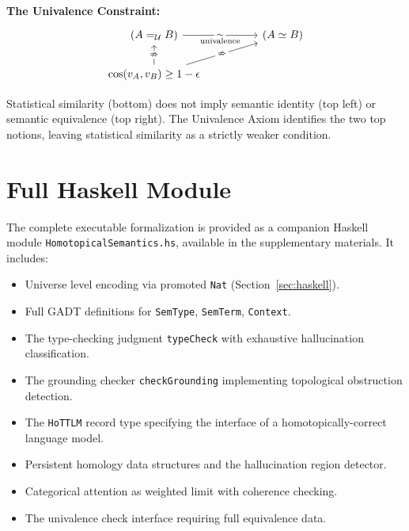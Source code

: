 \documentclass[11pt,a4paper,twocolumn]{article}
\theoremstyle{plain}
\theoremstyle{definition}
\begin{document}
\medskip
\textbf{The Univalence Constraint:}
\[
\begin{tikzcd}[column sep=huge]
(A =_{\mathcal{U}} B) \arrow[r, "\sim" {description}, "\text{univalence}"'] & (A \simeq B) \\
\cos(v_A, v_B) \geq 1-\epsilon \arrow[u, "\nRightarrow" {description}] \arrow[ur, "\nRightarrow"' {description}] &
\end{tikzcd}
\]

Statistical similarity (bottom) does not imply semantic identity (top left) or semantic equivalence (top right). The Univalence Axiom identifies the two top notions, leaving statistical similarity as a strictly weaker condition.

\section{Full Haskell Module}\label{app:haskell}

The complete executable formalization is provided as a companion Haskell module \texttt{HomotopicalSemantics.hs}, available in the supplementary materials. It includes:

\begin{itemize}[nosep]
  \item Universe level encoding via promoted \texttt{Nat} (Section~\ref{sec:haskell}).
  \item Full GADT definitions for \texttt{SemType}, \texttt{SemTerm}, \texttt{Context}.
  \item The type-checking judgment \texttt{typeCheck} with exhaustive hallucination classification.
  \item The grounding checker \texttt{checkGrounding} implementing topological obstruction detection.
  \item The \texttt{HoTTLM} record type specifying the interface of a homotopically-correct language model.
  \item Persistent homology data structures and the hallucination region detector.
  \item Categorical attention as weighted limit with coherence checking.
  \item The univalence check interface requiring full equivalence data.
\end{itemize}
\end{document}
